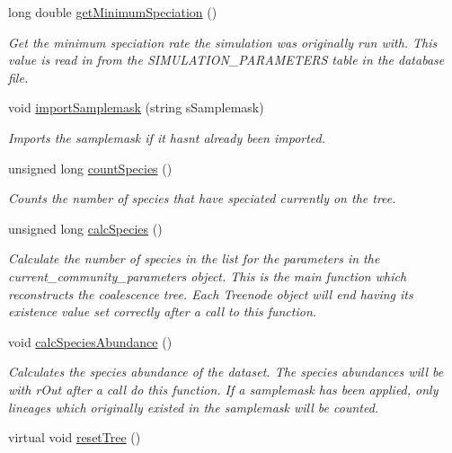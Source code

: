 \begin{DoxyCompactItemize}
long double \hyperlink{group___community_objects_a4e5dea65183810c3b27441736eca825a}{get\+Minimum\+Speciation} ()
\begin{DoxyCompactList}\small\item\em Get the minimum speciation rate the simulation was originally run with. This value is read in from the S\+I\+M\+U\+L\+A\+T\+I\+O\+N\+\_\+\+P\+A\+R\+A\+M\+E\+T\+E\+RS table in the database file. \end{DoxyCompactList}\item 
void \hyperlink{group___community_objects_a01a137383e1e23f2191d63f16513a00a}{import\+Samplemask} (string s\+Samplemask)
\begin{DoxyCompactList}\small\item\em Imports the samplemask if it hasn\textquotesingle{}t already been imported. \end{DoxyCompactList}\item 
unsigned long \hyperlink{group___community_objects_a07970398c04e7c31ceda695c2860e20f}{count\+Species} ()
\begin{DoxyCompactList}\small\item\em Counts the number of species that have speciated currently on the tree. \end{DoxyCompactList}\item 
unsigned long \hyperlink{group___community_objects_a241f69d1f69e61fc53c112fd874bf3ba}{calc\+Species} ()
\begin{DoxyCompactList}\small\item\em Calculate the number of species in the list for the parameters in the current\+\_\+community\+\_\+parameters object. This is the main function which reconstructs the coalescence tree. Each Treenode object will end having its existence value set correctly after a call to this function. \end{DoxyCompactList}\item 
void \hyperlink{group___community_objects_a502a409a75567d78575625346b6a969f}{calc\+Species\+Abundance} ()\hypertarget{group___community_objects_a502a409a75567d78575625346b6a969f}{}\label{group___community_objects_a502a409a75567d78575625346b6a969f}

\begin{DoxyCompactList}\small\item\em Calculates the species abundance of the dataset. The species abundances will be with r\+Out after a call do this function. If a samplemask has been applied, only lineages which originally existed in the samplemask will be counted. \end{DoxyCompactList}\item 
virtual void \hyperlink{group___community_objects_abd099aacb5332a9b89b3421e01269d24}{reset\+Tree} ()\hypertarget{group___community_objects_abd099aacb5332a9b89b3421e01269d24}{}\label{group___community_objects_abd099aacb5332a9b89b3421e01269d24}


\end{DoxyCompactItemize}
